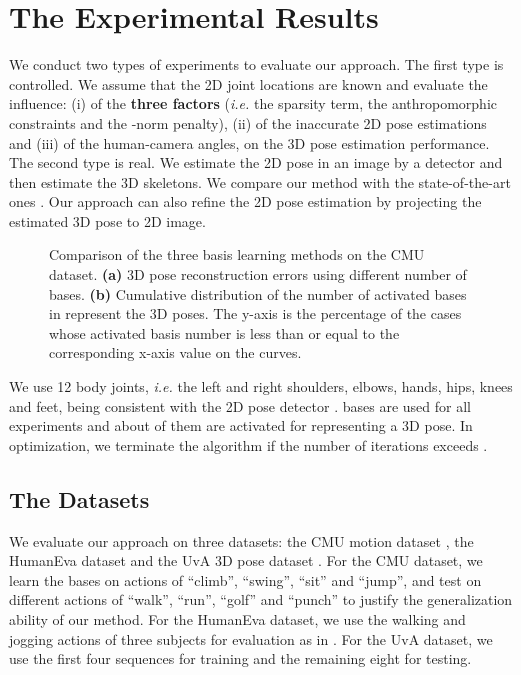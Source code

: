 \documentclass[10pt,twocolumn,letterpaper]{article}
\begin{document}
\section{The Experimental Results}
\label{sec:experiment} We conduct two types of experiments to
evaluate our approach. The first type is controlled. We assume
that the 2D joint locations are known and evaluate
the influence: (i) of the \textbf{three factors} ({\em i.e.} the sparsity term,
the anthropomorphic constraints and the -norm penalty), (ii) of
the inaccurate 2D pose estimations and (iii) of the human-camera angles, on
the 3D pose estimation performance. The second type is real. We
estimate the 2D pose in an image by a detector \cite{Yang2D} and then estimate the 3D skeletons. We compare our
method with the state-of-the-art ones \cite{Ramakrishna}
\cite{SimoSerraCVPR2012} \cite{Daubney}. Our approach can also
refine the 2D pose estimation by projecting the estimated 3D pose
to 2D image.

\begin{figure}
\centering \caption{Comparison of the three basis learning methods
on the CMU dataset. \textbf{(a)} 3D pose reconstruction errors
using different number of bases. \textbf{(b)} Cumulative distribution of the number of activated bases in represent the 3D poses. The y-axis is the percentage of the cases whose activated basis number is less than or equal to the corresponding x-axis value on the curves.}
\label{fig:basis}
\end{figure}


We use 12 body joints, {\em i.e.} the left and right shoulders, elbows,
hands, hips, knees and feet, being consistent with the 2D
pose detector \cite{Yang2D}.  bases are used for all
experiments and about  of them are activated for representing a 3D pose. In optimization, we terminate the
algorithm if the number of iterations exceeds .

\subsection{The Datasets}
We evaluate our approach on three datasets: the CMU motion dataset
\cite{c10}, the HumanEva dataset \cite{sigal2006humaneva} and the
UvA 3D pose dataset \cite{c28}. For the CMU dataset, we learn the bases on actions of
``climb'', ``swing'', ``sit'' and ``jump'', and test on different
actions of ``walk'', ``run'', ``golf'' and ``punch'' to justify
the generalization ability of our method. For the HumanEva
dataset, we use the walking and jogging actions of three subjects
for evaluation as in \cite{SimoSerraCVPR2012}. For the UvA dataset, we use the first four sequences for
training and the remaining eight for testing.
\end{document}
